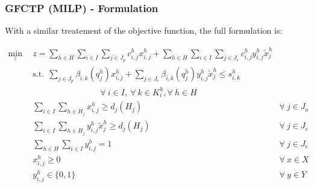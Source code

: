 \begin{frame}[ctb!]
  \frametitle{GFCTP (MILP) - Formulation} 
  
  With a similar treatement of the objective function, the full formulation is:
  
  \begin{subequations}\label{eqs:GFCTP-E}
    \begin{align}
      \label{eq:GRCTP-E_obj}
      \min_{z} \:\: 
      & 
      z = \sum_{h \in H}\sum_{i \in I}\sum_{j \in J_{p}}c_{i,j}^{h} x_{i,j}^{h} 
      + \sum_{h \in H}\sum_{i \in I}\sum_{j \in J_{e}}c_{i,j}^{h} y_{i,j}^{h} \tilde{x}_{j}^{h}
      && \\
      \label{eq:GRCTP-E_sup}
      &
      \text{s.t.} \:\: 
      \sum_{j \in J_{p}}\beta_{i,k}(q_{j}^{h}) x_{i,j}^{h}
      + \sum_{j \in J_{e}}\beta_{i,k}(q_{j}^{h}) y_{i,j}^{h} \tilde{x}_{j}^{h} \leq s_{i,k}^{h} \nonumber \\
      &
      \qquad\qquad\qquad\qquad
      \forall \: i \in I, \: \forall \: k \in K_{i}^{h}, \forall \: {h \in H}\\
      \label{eq:GRCTP-E_dem_p}
      &
      \sum_{i \in I}\sum_{h \in H_{j}} x_{i,j}^{h} \geq d_{j}(H_{j})
      &
      \forall \: j \in J_{o} &\\
      \label{eq:GRCTP-E_dem_e}
      &
      \sum_{i \in I}\sum_{h \in H_{j}} y_{i,j}^{h} \tilde{x}_{j}^{h} \geq d_{j}(H_{j}) 
      &
      \forall \: j \in J_{e}  &\\
      \label{eq:GRCTP-E_sumy}
      &
      \sum_{h \in H}\sum_{i \in I} y_{i,j}^{h} = 1
      &
      \forall \: j \in J_{e}  &\\
      \label{eq:GRCTP-E_x}
      &
      x_{i,j}^{h} \geq 0
      &
      \forall \: x \in X  &\\
      \label{eq:GRCTP-E_y}
      &
      y_{i,j}^{h} \in \{0,1\}
      &
      \forall \: y \in Y &
    \end{align}
  \end{subequations}

\end{frame}

